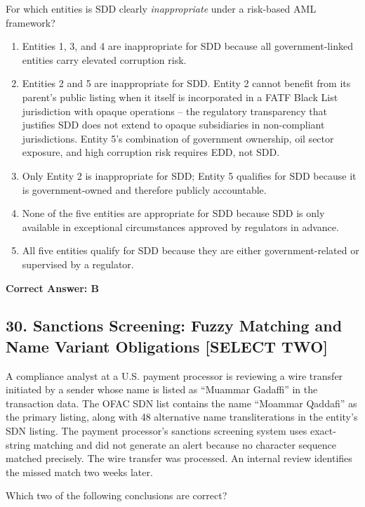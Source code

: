 \documentclass[11pt,a4paper]{article}
\begin{document}
	For which entities is SDD clearly \textit{inappropriate} under a risk-based AML framework?
	
	\begin{enumerate}[label=\Alph*.]
		\item Entities 1, 3, and 4 are inappropriate for SDD because all government-linked entities carry elevated corruption risk.
		\item Entities 2 and 5 are inappropriate for SDD. Entity 2 cannot benefit from its parent's public listing when it itself is incorporated in a FATF Black List jurisdiction with opaque operations -- the regulatory transparency that justifies SDD does not extend to opaque subsidiaries in non-compliant jurisdictions. Entity 5's combination of government ownership, oil sector exposure, and high corruption risk requires EDD, not SDD.
		\item Only Entity 2 is inappropriate for SDD; Entity 5 qualifies for SDD because it is government-owned and therefore publicly accountable.
		\item None of the five entities are appropriate for SDD because SDD is only available in exceptional circumstances approved by regulators in advance.
		\item All five entities qualify for SDD because they are either government-related or supervised by a regulator.
	\end{enumerate}
	\textbf{Correct Answer: B}
	
	\subsection{30. Sanctions Screening: Fuzzy Matching and Name Variant Obligations \textnormal{[SELECT TWO]}}
	
	A compliance analyst at a U.S. payment processor is reviewing a wire transfer initiated by a sender whose name is listed as ``Muammar Gadaffi'' in the transaction data. The OFAC SDN list contains the name ``Moammar Qaddafi'' as the primary listing, along with 48 alternative name transliterations in the entity's SDN listing. The payment processor's sanctions screening system uses exact-string matching and did not generate an alert because no character sequence matched precisely. The wire transfer was processed. An internal review identifies the missed match two weeks later.
	
	Which two of the following conclusions are correct?
	
\end{document}
